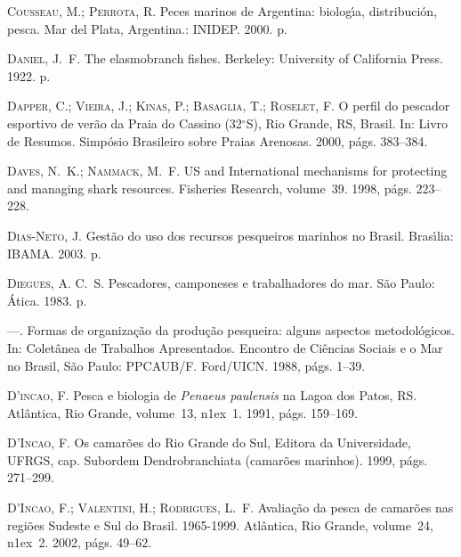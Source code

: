 \documentclass[a4paper,11pt,twoside,showtrims,onecolumn,openright,final]{memoir}
\begin{document}
\begin{thebibliography}{194}
\textsc{Cousseau, M.; Perrota, R.}
\newblock Peces marinos de {A}rgentina: biolog\'{\i}a, distribuci\'on, pesca.
\newblock Mar del Plata, Argentina.: INIDEP. 2000.
 p.

\textsc{Daniel, J.~F.}
\newblock The elasmobranch fishes.
\newblock Berkeley: University of California Press. 1922.
 p.

\textsc{Dapper, C.; Vieira, J.; Kinas, P.; Basaglia, T.; Roselet, F.}
\newblock O perfil do pescador esportivo de ver\~ao da {P}raia do {C}assino
  (32\mbox{$^\circ$}{S}), {R}io {G}rande, {RS}, {B}rasil.
\newblock In: Livro de {R}esumos. Simp\'osio Brasileiro sobre Praias Arenosas.
  2000, p\'ags. 383--384.

\textsc{Daves, N.~K.; Nammack, M.~F.}
\newblock U{S} and {I}nternational mechanisms for protecting and managing shark
  resources.
\newblock Fisheries Research, volume~39. 1998, p\'ags. 223--228.

\textsc{Dias-Neto, J.}
\newblock Gest\~ao do uso dos recursos pesqueiros marinhos no {B}rasil.
\newblock Bras\'{\i}lia: IBAMA. 2003.
 p.

\textsc{Diegues, A. C.~S.}
\newblock Pescadores, camponeses e trabalhadores do mar.
\newblock S\~ao Paulo: \'Atica. 1983.
 p.

---.
\newblock Formas de organiza\c{c}\~ao da produ\c{c}\~ao pesqueira: alguns
  aspectos metodol\'ogicos.
\newblock In: Colet\^anea de {T}rabalhos {A}presentados. Encontro de Ci\^encias
  Sociais e o Mar no Brasil, S\~ao Paulo: PPCAUB/F. Ford/UICN. 1988, p\'ags.
  1--39.

\textsc{D'incao, F.}
\newblock Pesca e biologia de \emph{{P}enaeus paulensis} na {L}agoa dos {P}atos, {RS}.
\newblock Atl\^antica, Rio Grande, volume~13,
  n\raise1ex\hbox{}~1. 1991, p\'ags. 159--169.

\textsc{D'Incao, F.}
\newblock Os camar\~oes do {R}io {G}rande do {S}ul, Editora da Universidade,
  UFRGS, cap. Subordem Dendrobranchiata (camar\~oes marinhos). 1999, p\'ags.
  271--299.

\textsc{D'Incao, F.; Valentini, H.; Rodrigues, L.~F.}
\newblock Avalia\c{c}\~ao da pesca de camar\~oes nas regi\~oes {S}udeste e
  {S}ul do {B}rasil. 1965-1999.
\newblock Atl\^antica, Rio Grande, volume~24,
  n\raise1ex\hbox{}~2. 2002, p\'ags. 49--62.


\end{thebibliography}
\end{document}
